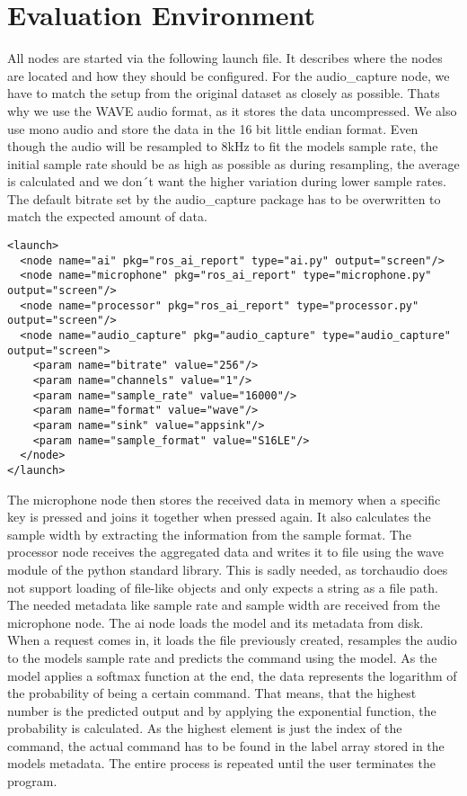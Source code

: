 \section{Evaluation Environment}
All nodes are started via the following launch file. It describes where the nodes are located and how they should be configured. For the audio\_capture node, we have to
match the setup from the original dataset as closely as possible. Thats why we use the WAVE audio format, as it stores the data uncompressed. We also use mono audio
and store the data in the 16 bit little endian format. Even though the audio will be resampled to 8kHz to fit the models sample rate, the initial sample rate should
be as high as possible as during resampling, the average is calculated and we don´t want the higher variation during lower sample rates. The default bitrate set by
the audio\_capture package has to be overwritten to match the expected amount of data.

\lstset{language=XML}
\begin{lstlisting}
<launch>
  <node name="ai" pkg="ros_ai_report" type="ai.py" output="screen"/>
  <node name="microphone" pkg="ros_ai_report" type="microphone.py" output="screen"/>
  <node name="processor" pkg="ros_ai_report" type="processor.py" output="screen"/>
  <node name="audio_capture" pkg="audio_capture" type="audio_capture" output="screen">
    <param name="bitrate" value="256"/>
    <param name="channels" value="1"/>
    <param name="sample_rate" value="16000"/>
    <param name="format" value="wave"/>
    <param name="sink" value="appsink"/>
    <param name="sample_format" value="S16LE"/>
  </node>
</launch>
\end{lstlisting}

The microphone node then stores the received data in memory when a specific key is pressed and joins it together when pressed again. It also calculates the
sample width by extracting the information from the sample format. The processor node receives the aggregated data and writes it to file using the wave module
of the python standard library. This is sadly needed, as torchaudio does not support loading of file-like objects and only expects a string as a file path. The 
needed metadata like sample rate and sample width are received from the microphone node. The ai node loads the model and its metadata from disk. When a request
comes in, it loads the file previously created, resamples the audio to the models sample rate and predicts the command using the model. As the model applies a softmax
function at the end, the data represents the logarithm of the probability of being a certain command. That means, that the highest number is the predicted output
and by applying the exponential function, the probability is calculated. As the highest element is just the index of the command, the actual command has to
be found in the label array stored in the models metadata. The entire process is repeated until the user terminates the program.
